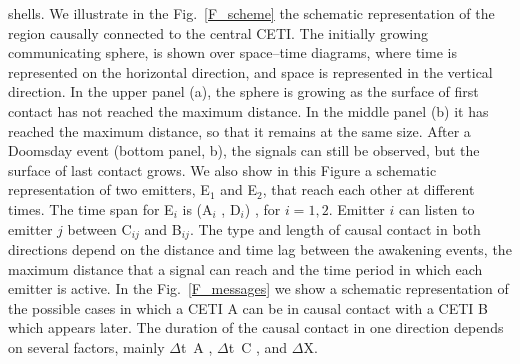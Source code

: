 \documentclass[crop]{CSLB}%
\begin{document}
shells.
%
We illustrate in the Fig.~\ref{F_scheme} the schematic
representation of the region causally connected to the central CETI.
%
%
%
%
%
%
The initially growing communicating sphere, is shown over
space--time diagrams, where time is represented on the horizontal
direction, and space is represented in the vertical direction.
%
In the upper panel (a), the sphere is growing as the surface of first
contact has not reached the maximum distance.
%
In the middle panel (b) it has reached the maximum distance, so that
it remains at the same size.
%
After a Doomsday event (bottom panel, b), the signals can still be
observed, but the surface of last contact grows.
%
We also show in this Figure a schematic representation of two
emitters, E$_1$ and E$_2$, that reach each other at different times.
%
The time span for E$_i$ is (A$_i$ , D$_i$) , for $i = {1, 2}$.
%
Emitter $i$ can listen to emitter $j$ between C$_{ij}$ and B$_{ij}$.
%
The type and length of causal contact in both directions depend on the
distance and time lag between the awakening events, the maximum
distance that a signal can reach and the time period in which each
emitter is active.
%
In the Fig.~\ref{F_messages} we show a schematic representation of the
possible cases in which a CETI A can be in causal contact with a CETI
B which appears later.
%
The duration of the causal contact in one direction depends on several
factors, mainly $\Delta$t~A , $\Delta$t~C , and $\Delta$X.
\end{document}
